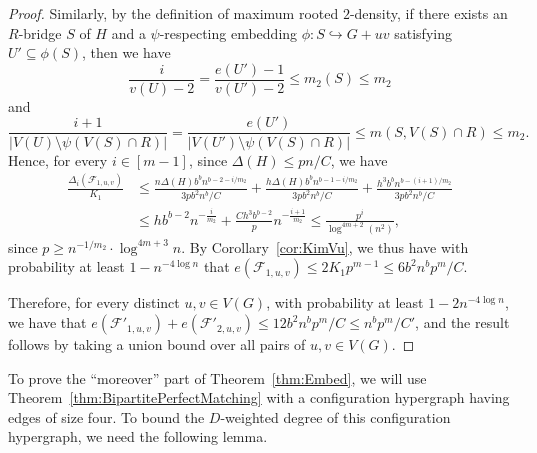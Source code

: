 \documentclass[11pt]{article}
\numberwithin{equation}{section}
\newcounter{i}
\theoremstyle{plain}
\theoremstyle{plain} %
\theoremstyle{definition}
\newcommand{\cF}{\mathcal{F}}
\begin{document}
\begin{proof}
Similarly, by the definition of maximum rooted $2$-density, if there exists an $R$-bridge $S$ of $H$ and a $\psi$-respecting embedding $\phi : S \hookrightarrow G + uv$ satisfying $U' \subseteq \phi(S)$, then we have
\begin{equation*}
    \frac{i}{v(U) - 2} = \frac{e(U')-1}{v(U') - 2} \leq m_2(S) \leq m_2
\end{equation*}
and 
\begin{equation*}
    \frac{i + 1}{|V(U)\setminus \psi(V(S)\cap R)|} = \frac{e(U')}{|V(U')\setminus \psi(V(S)\cap R)|} \leq m(S, V(S) \cap R) \leq m_2.
\end{equation*}
Hence, for every $i \in [m - 1]$, since $\Delta(H) \leq pn / C$, we have
\begin{align*}
    \frac{\Delta_i(\cF_{1,u,v})}{K_1} &\leq 
    \frac{n\Delta(H)b^bn^{b - 2 - i/m_2}}{3pb^2n^b/C} + 
    \frac{h\Delta(H)b^bn^{b - 1 - i/m_2}}{3pb^2n^b/C} + 
    \frac{h^3 b^bn^{b - (i+1)/m_2}}{3pb^2n^b/C} \\
    &\leq hb^{b-2}n^{-\frac{i}{m_2}} + \frac{C h^3b^{b-2}}{p}n^{-\frac{i+1}{m_2}}
     \leq \frac{p^i}{\log^{4m+2}(n^2)},
\end{align*}
since $p \geq n^{-1/m_2} \cdot \log^{4m+3}n$.  
By Corollary~\ref{cor:KimVu}, we thus have with probability at least $1-n^{-4\log n}$ that $e(\cF_{1,u,v}) \leq 2K_1p^{m-1} \leq 6b^2 n^b p^m / C$. 

Therefore, for every distinct $u,v\in V(G)$, with probability at least $1 - 2n^{-4\log n}$, we have that $e(\cF'_{1,u,v}) + e(\cF'_{2,u,v}) \leq 12 b^2 n^b p^m / C \leq n^b p^m / C'$, and the result follows by taking a union bound over all pairs of $u,v \in V(G)$.
\end{proof}

To prove the ``moreover'' part of Theorem~\ref{thm:Embed}, we will use Theorem~\ref{thm:BipartitePerfectMatching} with a configuration hypergraph having edges of size four.  To bound the $D$-weighted degree of this configuration hypergraph, we need the following lemma.
\end{document}
